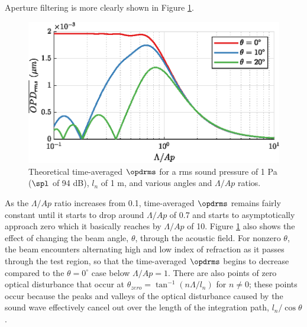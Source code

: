 Aperture filtering is more clearly shown in Figure \ref{fig:03_planar_sample_calc_1}.
\begin{figure}
  \centering
  \includegraphics{../matlab/03_aero_optics_acoustics/planar_sample_calc_1.eps}
  \caption{Theoretical time-averaged $\opdrms$ for a rms sound pressure of 1 Pa ($\spl$ of 94 dB), $l_n$ of 1 m, and various angles and $\Lambda/Ap$ ratios.}
  \label{fig:03_planar_sample_calc_1}
\end{figure}
As the $\Lambda/Ap$ ratio increases from 0.1, time-averaged $\opdrms$ remains fairly constant until it starts to drop around $\Lambda/Ap$ of 0.7 and starts to asymptotically approach zero which it basically reaches by $\Lambda/Ap$ of 10.
Figure \ref{fig:03_planar_sample_calc_1} also shows the effect of changing the beam angle, $\theta$, through the acoustic field.
For nonzero $\theta$, the beam encounters alternating high and low index of refraction as it passes through the test region, so that the time-averaged $\opdrms$ begins to decrease compared to the $\theta = 0^\circ$ case below $\Lambda/Ap=1$.
There are also points of zero optical disturbance that occur at $\theta_{zero}=\tan^{-1}(n\Lambda/l_n)$ for $n\neq0$; these points occur because the peaks and valleys of the optical disturbance caused by the sound wave effectively cancel out over the length of the integration path, $l_n/\cos\theta$.

